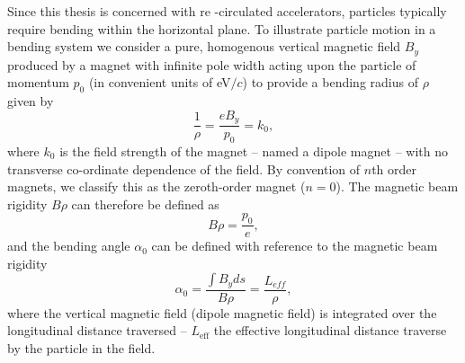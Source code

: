 \documentclass[../main.tex]{subfiles}
\begin{document}
Since this thesis is concerned with re -circulated accelerators, particles typically require bending within the horizontal plane. To illustrate particle motion in a bending system we consider a pure, homogenous vertical magnetic field $B_{y}$ produced by a magnet with infinite pole width acting upon the particle of momentum $p_{0}$ (in convenient units of \si{\electronvolt}$/c$) to provide a bending radius of $\rho$ given by
\begin{equation}
\frac{1}{\rho} = \frac{eB_{y}}{p_{0}} = k_{0},
\label{magnet_bending_radius}    
\end{equation}
where $k_{0}$ is the field strength of the magnet -- named a dipole magnet -- with no transverse co-ordinate dependence of the field. By convention of $n$th order magnets, we classify this as the zeroth-order magnet ($n=0$). The magnetic beam rigidity $B\rho$ can therefore be defined as
\begin{equation}
B\rho = \frac{p_{0}}{e},
\label{eq:magnetic_beam_rigidity}    
\end{equation}
and the bending angle $\alpha_{0}$ can be defined with reference to the magnetic beam rigidity
\begin{equation}
\alpha_{0} = \frac{\int B_{y} ds}{B\rho} = \frac{L_{eff}}{\rho}, 
\label{eq:dipole_bending_angle}    
\end{equation}
where the vertical magnetic field (dipole magnetic field) is integrated over the longitudinal distance traversed -- $L_{\mathrm{eff}}$ the effective longitudinal distance traverse by the particle in the field.
\end{document}

